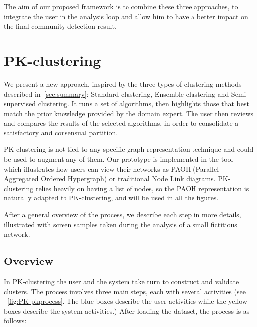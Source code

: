 The aim of our proposed framework is to combine these three approaches, to integrate the user in the analysis loop and allow him to have a better impact on the final community detection result.




\section{PK-clustering}

We present a new approach, inspired by the three types of clustering methods described in~\autoref{sec:summary}: Standard clustering, Ensemble clustering and Semi-supervised clustering. It runs a set of algorithms, then highlights those that best match the prior knowledge provided by the domain expert. %
The user then reviews and compares the results of the selected algorithms, in order to consolidate a satisfactory and consensual partition.

PK-clustering is not tied to any specific graph representation technique and could be used to augment any of them. Our prototype is implemented in the \paovis tool~\cite{paohvis} which illustrates how users can view their networks as PAOH (Parallel Aggregated Ordered Hypergraph) or traditional Node Link diagrams. PK-clustering relies heavily on having a list of nodes, so the PAOH representation is naturally adapted to PK-clustering, and will be used in all the figures.

After a general overview of the process, we describe each step in more details, illustrated with screen samples taken during the analysis of a small fictitious network.

\subsection{Overview}
\label{sec:pk-clustering}

In PK-clustering the user and the system take turn to construct and validate clusters.
The process involves three main steps, each with several activities (see ~\autoref{fig:PK-pkprocess}.
The blue boxes describe the user activities while the yellow boxes describe the system activities.)
After loading the dataset, the process is as follows:

